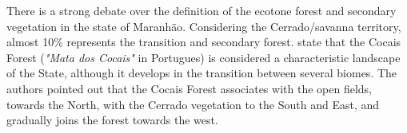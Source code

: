 There is a strong debate over the definition of the ecotone forest and secondary vegetation in the state of Maranhão. Considering the Cerrado/savanna territory, almost 10\% represents the transition and secondary forest. \citet{REIS_2010} state that the Cocais Forest (\textit{"Mata dos Cocais"} in Portugues) is considered a characteristic landscape of the State, although it develops in the transition between several biomes. The authors pointed out that the Cocais Forest associates with the open fields, towards the North, with the Cerrado vegetation to the South and East, and gradually joins the forest towards the west. 









